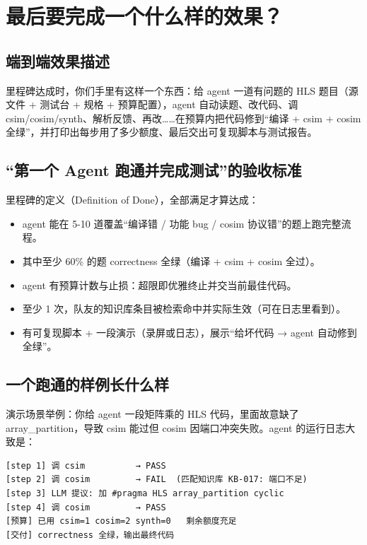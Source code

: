 \documentclass[12pt,a4paper]{ctexbook}
\begin{document}
\chapter{最后要完成一个什么样的效果？}

\section{端到端效果描述}

里程碑达成时，你们手里有这样一个东西：给 agent 一道有问题的 HLS 题目（源文件 + 测试台 + 规格 + 预算配置），agent 自动读题、改代码、调 csim/cosim/synth、解析反馈、再改……在预算内把代码修到“编译 + csim + cosim 全绿”，并打印出每步用了多少额度、最后交出可复现脚本与测试报告。

\section{“第一个 Agent 跑通并完成测试”的验收标准}

里程碑的定义（Definition of Done），全部满足才算达成：

\begin{itemize}
\item agent 能在 5-10 道覆盖“编译错 / 功能 bug / cosim 协议错”的题上跑完整流程。
\item 其中至少 60\% 的题 correctness 全绿（编译 + csim + cosim 全过）。
\item agent 有预算计数与止损：超限即优雅终止并交当前最佳代码。
\item 至少 1 次，队友的知识库条目被检索命中并实际生效（可在日志里看到）。
\item 有可复现脚本 + 一段演示（录屏或日志），展示“给坏代码 → agent 自动修到全绿”。
\end{itemize}

\section{一个跑通的样例长什么样}

演示场景举例：你给 agent 一段矩阵乘的 HLS 代码，里面故意缺了 array\_partition，导致 csim 能过但 cosim 因端口冲突失败。agent 的运行日志大致是：

\begin{lstlisting}
[step 1] 调 csim          → PASS
[step 2] 调 cosim         → FAIL  (匹配知识库 KB-017: 端口不足)
[step 3] LLM 提议: 加 #pragma HLS array_partition cyclic
[step 4] 调 cosim         → PASS
[预算] 已用 csim=1 cosim=2 synth=0   剩余额度充足
[交付] correctness 全绿，输出最终代码
\end{lstlisting}
\end{document}
